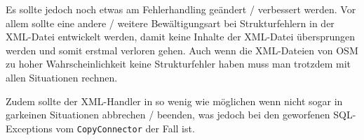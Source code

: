 Es sollte jedoch noch etwas am Fehlerhandling geändert / verbessert werden. Vor allem sollte eine andere / weitere Bewältigungsart bei Strukturfehlern in der XML-Datei entwickelt werden, damit keine Inhalte der XML-Datei übersprungen werden und somit erstmal verloren gehen. Auch wenn die XML-Dateien von OSM zu hoher Wahrscheinlichkeit keine Strukturfehler haben muss man trotzdem mit allen Situationen rechnen.

Zudem sollte der XML-Handler in so wenig wie möglichen wenn nicht sogar in garkeinen Situationen abbrechen / beenden, was jedoch bei den geworfenen SQL-Exceptions vom {\tt CopyConnector} der Fall ist.


